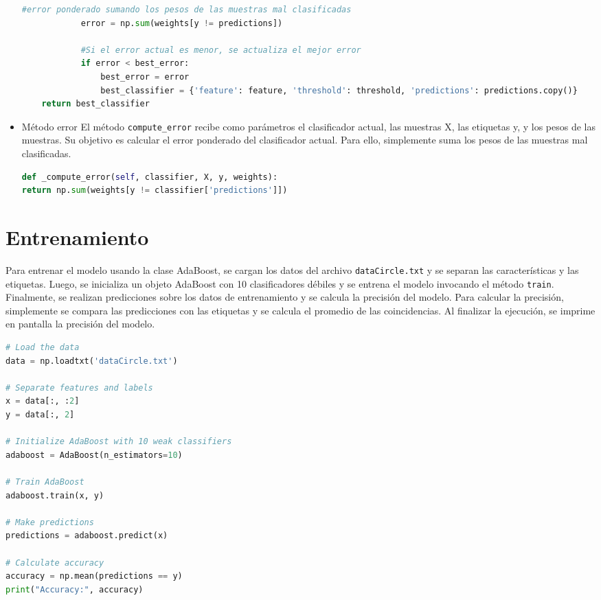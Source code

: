 \documentclass{article}
\begin{document}
\begin{itemize}
\begin{lstlisting}[language=Python, caption={weak\_classifier method}, label={lst:weak_classifier_method}]
            #error ponderado sumando los pesos de las muestras mal clasificadas
            error = np.sum(weights[y != predictions])

            #Si el error actual es menor, se actualiza el mejor error
            if error < best_error:
                best_error = error
                best_classifier = {'feature': feature, 'threshold': threshold, 'predictions': predictions.copy()}
    return best_classifier
        \end{lstlisting}
        \item Método error
        \newline
        El método \texttt{compute\_error} recibe como parámetros el clasificador actual, las muestras X, las etiquetas y, y los pesos de las muestras.
        Su objetivo es calcular el error ponderado del clasificador actual.
        Para ello, simplemente suma los pesos de las muestras mal clasificadas.
        \begin{lstlisting}[language=Python, caption={compute\_error method}, label={lst:compute_error_method}]
def _compute_error(self, classifier, X, y, weights):
return np.sum(weights[y != classifier['predictions']])
        \end{lstlisting}

    \end{itemize}


    \section{Entrenamiento}\label{sec:entrenamiento}
    \newline
    Para entrenar el modelo usando la clase AdaBoost, se cargan los datos del archivo \texttt{dataCircle.txt} y se separan las características y las etiquetas.
    Luego, se inicializa un objeto AdaBoost con 10 clasificadores débiles y se entrena el modelo invocando el método \texttt{train}.
    Finalmente, se realizan predicciones sobre los datos de entrenamiento y se calcula la precisión del modelo.
    Para calcular la precisión, simplemente se compara las predicciones con las etiquetas y se calcula el promedio de las coincidencias.
    Al finalizar la ejecución, se imprime en pantalla la precisión del modelo.
    \begin{lstlisting}[language=Python, caption={Training the model}, label={lst:training}]
# Load the data
data = np.loadtxt('dataCircle.txt')

# Separate features and labels
x = data[:, :2]
y = data[:, 2]

# Initialize AdaBoost with 10 weak classifiers
adaboost = AdaBoost(n_estimators=10)

# Train AdaBoost
adaboost.train(x, y)

# Make predictions
predictions = adaboost.predict(x)

# Calculate accuracy
accuracy = np.mean(predictions == y)
print("Accuracy:", accuracy)
    \end{lstlisting}
\end{document}
